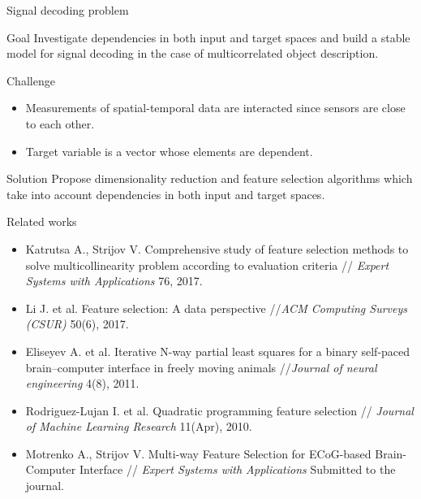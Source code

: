 \documentclass[9pt]{beamer}
\begin{document}
\begin{frame}{Signal decoding problem}
	\begin{block}{Goal}
		Investigate dependencies in both input and target spaces and build a stable model for signal decoding in the case of multicorrelated object description.
	\end{block}
	\begin{block}{Challenge}
		\begin{itemize}
			\item Measurements of spatial-temporal data are interacted since sensors are close to each other.
			\item Target variable is a vector whose elements are dependent.
		\end{itemize}
	\end{block}
	\begin{block}{Solution}
		Propose dimensionality reduction and feature selection algorithms which take into account dependencies in both input and target spaces. 
	\end{block}
\end{frame}
\begin{frame}{Related works}
	\begin{itemize}
		\item Katrutsa A., Strijov V. Comprehensive study of feature selection methods to solve multicollinearity problem according to evaluation criteria // \textit{Expert Systems with Applications} 76, 2017.
		\vfill
		\item Li J. et al. Feature selection: A data perspective //\textit{ACM Computing Surveys (CSUR)} 50(6), 2017.
		\vfill
		\item Eliseyev A. et al. Iterative N-way partial least squares for a binary self-paced brain–computer interface in freely moving animals //\textit{Journal of neural engineering} 4(8), 2011.
		\vfill
		\item Rodriguez-Lujan I. et al. Quadratic programming feature selection // \textit{Journal of Machine Learning Research} 11(Apr), 2010.
		\vfill
		\item Motrenko A., Strijov V. Multi-way Feature Selection for ECoG-based Brain-Computer Interface // \textit{Expert Systems with Applications} Submitted to the journal.
	\end{itemize}
\end{frame}
\end{document}
